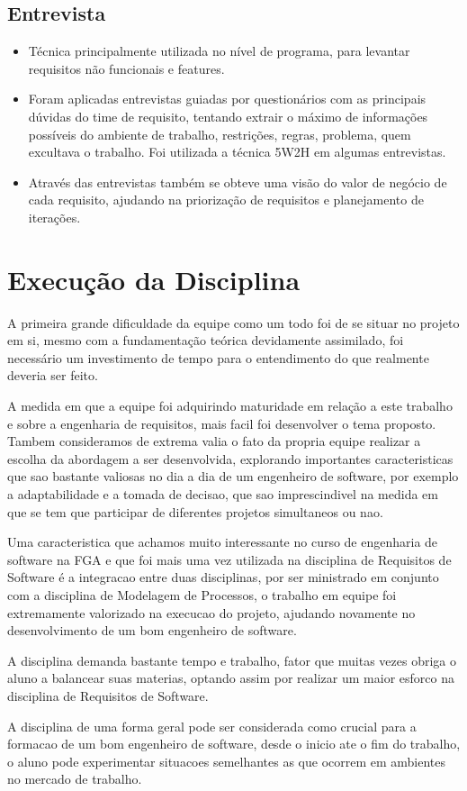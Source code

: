 \subsection{Entrevista}
\begin{itemize}
\item Técnica principalmente utilizada no nível de programa, para levantar requisitos não funcionais e features.
\item Foram aplicadas entrevistas  guiadas por questionários  com as principais dúvidas do time de requisito, tentando extrair o máximo de informações possíveis do ambiente de trabalho, restrições, regras, problema, quem excultava o trabalho. Foi utilizada a técnica 5W2H\cite{wh} em algumas entrevistas.
\item Através das entrevistas também se obteve uma visão do valor de negócio de cada requisito, ajudando na priorização de requisitos e planejamento de iterações.
\end{itemize}


\section{Execução da Disciplina}

A primeira grande dificuldade da equipe como um todo foi de se situar no projeto em si,
mesmo com a fundamentação teórica devidamente assimilado, foi necessário um investimento
de tempo para o entendimento do que realmente deveria ser feito.

A medida em que a equipe foi adquirindo maturidade em relação a este trabalho e sobre a
engenharia de requisitos, mais facil foi desenvolver o tema proposto. Tambem consideramos
de extrema valia o fato da propria equipe realizar a escolha da abordagem a ser desenvolvida,
explorando importantes caracteristicas que sao bastante valiosas no dia a dia de um engenheiro
de software, por exemplo a adaptabilidade e a tomada de decisao, que sao imprescindivel na
medida em que se tem que participar de diferentes projetos simultaneos ou nao.

Uma caracteristica que achamos muito interessante no curso de engenharia de software na
FGA e que foi mais uma vez utilizada na disciplina de Requisitos de Software é a integracao
entre duas disciplinas, por ser ministrado em conjunto com a disciplina de Modelagem de
Processos, o trabalho em equipe foi extremamente valorizado na execucao do projeto, ajudando
novamente no desenvolvimento de um bom engenheiro de software.

A disciplina demanda bastante tempo e trabalho, fator que muitas vezes obriga o aluno
a balancear suas materias, optando assim por realizar um maior esforco na disciplina
de Requisitos de Software.

A disciplina de uma forma geral pode ser considerada como crucial para a formacao
de um bom engenheiro de software, desde o inicio ate o fim do trabalho, o aluno pode
experimentar situacoes semelhantes as que ocorrem em ambientes no mercado de trabalho.
